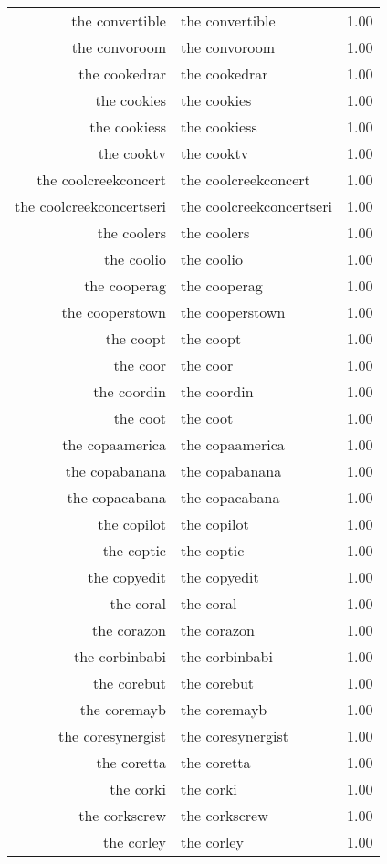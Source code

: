 \begin{table}[ht]
\begin{tabular}{rlr}
  the convertible & the convertible & 1.00 \\ 
  the convoroom & the convoroom & 1.00 \\ 
  the cookedrar & the cookedrar & 1.00 \\ 
  the cookies & the cookies & 1.00 \\ 
  the cookiess & the cookiess & 1.00 \\ 
  the cooktv & the cooktv & 1.00 \\ 
  the coolcreekconcert & the coolcreekconcert & 1.00 \\ 
  the coolcreekconcertseri & the coolcreekconcertseri & 1.00 \\ 
  the coolers & the coolers & 1.00 \\ 
  the coolio & the coolio & 1.00 \\ 
  the cooperag & the cooperag & 1.00 \\ 
  the cooperstown & the cooperstown & 1.00 \\ 
  the coopt & the coopt & 1.00 \\ 
  the coor & the coor & 1.00 \\ 
  the coordin & the coordin & 1.00 \\ 
  the coot & the coot & 1.00 \\ 
  the copaamerica & the copaamerica & 1.00 \\ 
  the copabanana & the copabanana & 1.00 \\ 
  the copacabana & the copacabana & 1.00 \\ 
  the copilot & the copilot & 1.00 \\ 
  the coptic & the coptic & 1.00 \\ 
  the copyedit & the copyedit & 1.00 \\ 
  the coral & the coral & 1.00 \\ 
  the corazon & the corazon & 1.00 \\ 
  the corbinbabi & the corbinbabi & 1.00 \\ 
  the corebut & the corebut & 1.00 \\ 
  the coremayb & the coremayb & 1.00 \\ 
  the coresynergist & the coresynergist & 1.00 \\ 
  the coretta & the coretta & 1.00 \\ 
  the corki & the corki & 1.00 \\ 
  the corkscrew & the corkscrew & 1.00 \\ 
  the corley & the corley & 1.00 \\ 

\end{tabular}
\end{table}
